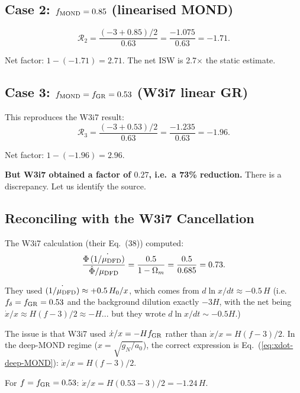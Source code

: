 \documentclass[11pt,a4paper]{article}
\newcommand{\Hzero}{H_0}
\newcommand{\aM}{a_0}
\newcommand{\mufd}{\mu_{\rm DFD}}
\newcommand{\Omm}{\Omega_m}
\begin{document}
\subsection{Case 2: $f_{\rm MOND} = 0.85$ (linearised MOND)}

\begin{equation}
\mathcal{R}_2 = \frac{(-3 + 0.85)/2}{0.63}
= \frac{-1.075}{0.63} = -1.71.
\label{eq:R2}
\end{equation}

Net factor: $1 - (-1.71) = 2.71$. The net ISW is 2.7$\times$ the
static estimate.


\subsection{Case 3: $f_{\rm MOND} = f_{\rm GR} = 0.53$ (W3i7 linear GR)}

This reproduces the W3i7 result:
\begin{equation}
\mathcal{R}_3 = \frac{(-3 + 0.53)/2}{0.63}
= \frac{-1.235}{0.63} = -1.96.
\end{equation}

Net factor: $1 - (-1.96) = 2.96$.

\textbf{But W3i7 obtained a factor of $0.27$, i.e.\ a 73\% reduction.}
There is a discrepancy. Let us identify the source.

\subsection{Reconciling with the W3i7 Cancellation}
\label{sec:reconcile-W3i7}

The W3i7 calculation (their Eq.~(38)) computed:
\begin{equation}
\frac{\Phi\,\dot{(1/\mufd)}}{\dot{\Phi}/\mufd}
= \frac{0.5}{1-\Omm} = \frac{0.5}{0.685} = 0.73.
\end{equation}

They used $\dot{(1/\mufd)} \approx +0.5\,\Hzero/x$, which comes from
$d\ln x/dt \approx -0.5\,H$ (i.e.\ $f_\delta = f_{\rm GR} = 0.53$
and the background dilution exactly $-3H$, with the net being
$\dot{x}/x \approx H(f - 3)/2 \approx -H$... but they wrote
$d\ln x/dt \sim -0.5H$.)

The issue is that W3i7 used $\dot{x}/x = -Hf_{\rm GR}$ rather
than $\dot{x}/x = H(f-3)/2$. In the deep-MOND regime
($x = \sqrt{g_N/\aM}$), the correct expression is
Eq.~(\ref{eq:xdot-deep-MOND}): $\dot{x}/x = H(f-3)/2$.

For $f = f_{\rm GR} = 0.53$: $\dot{x}/x = H(0.53-3)/2 = -1.24\,H$.
\end{document}
